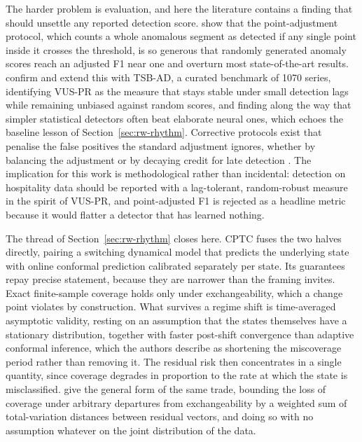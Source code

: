 The harder problem is evaluation, and here the literature contains a finding
that should unsettle any reported detection score. \citet{kim_towards_2022}
show that the point-adjustment protocol, which counts a whole anomalous segment
as detected if any single point inside it crosses the threshold, is so generous
that randomly generated anomaly scores reach an adjusted F1 near one and
overturn most state-of-the-art results. \citet{liu_elephant_2024} confirm and
extend this with TSB-AD, a curated benchmark of 1070 series, identifying VUS-PR
as the measure that stays stable under small detection lags while remaining
unbiased against random scores, and finding along the way that simpler
statistical detectors often beat elaborate neural ones, which echoes the
baseline lesson of Section~\ref{sec:rw-rhythm}. Corrective protocols exist that
penalise the false positives the standard adjustment ignores, whether by
balancing the adjustment or by decaying credit for late detection
\citep{bhattacharya_towards_2024,gim_evaluation_2023}. The implication for this
work is methodological rather than incidental: detection on hospitality data
should be reported with a lag-tolerant, random-robust measure in the spirit of
VUS-PR, and point-adjusted F1 is rejected as a headline metric because it
would flatter a detector that has learned nothing.

The thread of Section~\ref{sec:rw-rhythm} closes here. CPTC
\citep{sun_conformal_2025} fuses the two halves directly, pairing a switching
dynamical model that predicts the underlying state with online conformal
prediction calibrated separately per state. Its guarantees repay precise
statement, because they are narrower than the framing invites. Exact
finite-sample coverage holds only under exchangeability, which a change point
violates by construction. What survives a regime shift is time-averaged
asymptotic validity, resting on an assumption that the states themselves have
a stationary distribution, together with faster post-shift convergence than
adaptive conformal inference, which the authors describe as shortening the
miscoverage period rather than removing it. The residual risk then concentrates
in a single quantity, since coverage degrades in proportion to the rate at
which the state is misclassified. \citet{barber_conformal_2023} give the
general form of the same trade, bounding the loss of coverage under arbitrary
departures from exchangeability by a weighted sum of total-variation distances
between residual vectors, and doing so with no assumption whatever on the joint
distribution of the data.

